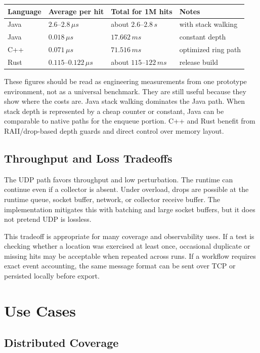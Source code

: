 \documentclass[11pt]{article}
\begin{document}
\begin{center}
\begin{tabular}{llll}
\textbf{Language} & \textbf{Average per hit} & \textbf{Total for 1M hits} & \textbf{Notes} \\
\hline
Java & \(2.6\)--\(2.8\,\mu s\) & about \(2.6\)--\(2.8\,s\) & with stack walking \\
Java & \(0.018\,\mu s\) & \(17.662\,ms\) & constant depth \\
C++ & \(0.071\,\mu s\) & \(71.516\,ms\) & optimized ring path \\
Rust & \(0.115\)--\(0.122\,\mu s\) & about \(115\)--\(122\,ms\) & release build \\
\end{tabular}
\end{center}

These figures should be read as engineering measurements from one prototype
environment, not as a universal benchmark. They are still useful because they show
where the costs are. Java stack walking dominates the Java path. When stack
depth is represented by a cheap counter or constant, Java can be comparable to
native paths for the enqueue portion. C++ and Rust benefit from RAII/drop-based
depth guards and direct control over memory layout.

\subsection{Throughput and Loss Tradeoffs}

The UDP path favors throughput and low perturbation. The runtime can continue
even if a collector is absent. Under overload, drops are possible at the
runtime queue, socket buffer, network, or collector receive buffer. The
implementation mitigates this with batching and large socket buffers, but it
does not pretend UDP is lossless.

This tradeoff is appropriate for many coverage and observability uses. If a
test is checking whether a location was exercised at least once, occasional
duplicate or missing hits may be acceptable when repeated across runs. If a
workflow requires exact event accounting, the same message format can be sent
over TCP or persisted locally before export.

\section{Use Cases}

\subsection{Distributed Coverage}
\end{document}
